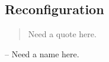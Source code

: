 \documentclass[12pt, final]{ucthesis}
\begin{document}
\begin{dissertationText}
%    

%    

%    

\chapter{Reconfiguration              			 %
    \label{chap:reconfig}}                
				\begin{quote}
        Need a quote here.
        \end{quote}
            \begin{flushright}
            -- Need a name here.
            \end{flushright}
    

\clearpage



\end{dissertationText}
\end{document}
